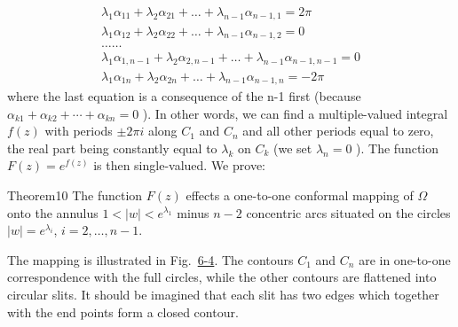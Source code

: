 \begin{equation*}
\begin{array}{l} \lambda_ {1} \alpha_ {1 1} + \lambda_ {2} \alpha_ {2 1} + \dots + \lambda_ {n - 1} \alpha_ {n - 1, 1} = 2 \pi \\ \lambda_ {1} \alpha_ {1 2} + \lambda_ {2} \alpha_ {2 2} + \dots + \lambda_ {n - 1} \alpha_ {n - 1, 2} = 0 \\ \dots \dots \\ \lambda_ {1} \alpha_ {1, n - 1} + \lambda_ {2} \alpha_ {2, n - 1} + \dots + \lambda_ {n - 1} \alpha_ {n - 1, n - 1} = 0 \\ \lambda_ {1} \alpha_ {1 n} + \lambda_ {2} \alpha_ {2 n} + \dots + \lambda_ {n - 1} \alpha_ {n - 1, n} = - 2 \pi \end{array}\tag{14}\label{eq:6.14}
\end{equation*}
where the last equation is a consequence of the n-1 first (because $\alpha_{k1} + \alpha_{k2} + \cdots + \alpha_{kn} = 0$ ). In other words, we can find a multiple-valued integral $f(z)$ with periods $\pm 2\pi i$ along $C_{1}$ and $C_{n}$ and all other periods equal to zero, the real part being constantly equal to $\lambda_{k}$ on $C_{k}$ (we set $\lambda_{n} = 0$ ). The function $F(z) = e^{f(z)}$ is then single-valued. We prove:

\begin{originalstatement}{Theorem}{10}\label{thm:6.10}
The function $F(z)$ effects a one-to-one conformal mapping of $\Omega$ onto the annulus $1 < |w| < e^{\lambda_1}$ minus $n - 2$ concentric arcs situated on the circles $|w| = e^{\lambda_i}$, $i = 2, \ldots, n - 1$.
\end{originalstatement}
The mapping is illustrated in Fig.~\hyperref[fig:6-4]{6-4}. The contours $C_{1}$ and $C_{n}$ are in one-to-one correspondence with the full circles, while the other contours are flattened into circular slits. It should be imagined that each slit has two edges which together with the end points form a closed contour.

